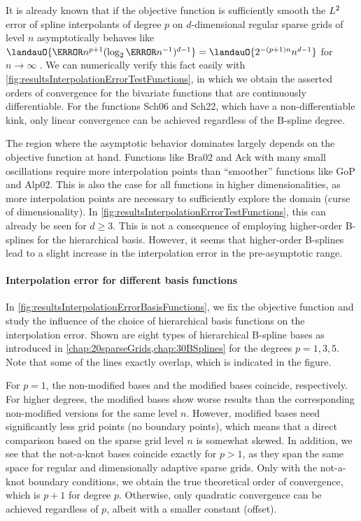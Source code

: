 It is already known that
if the objective function is sufficiently smooth
the $L^2$ error of spline interpolants of degree $p$ on
$d$-dimensional regular sparse grids of level $n$
asymptotically behaves like
$\landauO{\ms{n}^{p+1} (\log_2 \ms{n}^{-1})^{d-1}}
= \landauO{2^{-(p+1)n} n^{d-1}}$ for $n \to \infty$ \cite{Sickel11Spline}.
We can numerically verify this fact easily with
\cref{fig:resultsInterpolationErrorTestFunctions},
in which we obtain the asserted orders of convergence
for the bivariate functions that are continuously differentiable.
For the functions Sch06 and Sch22, which have a non-differentiable kink,
only linear convergence can be achieved regardless of the B-spline degree.

The region where the asymptotic behavior dominates largely depends
on the objective function at hand.
Functions like Bra02 and Ack with many small oscillations
require more interpolation points than ``smoother'' functions like
GoP and Alp02.
This is also the case for all functions in higher dimensionalities,
as more interpolation points are necessary to sufficiently explore the domain
(curse of dimensionality).
In \cref{fig:resultsInterpolationErrorTestFunctions}, this can already be seen
for $d \ge 3$.
This is not a consequence of employing higher-order B-splines for
the hierarchical basis.
However, it seems that higher-order B-splines lead to a slight increase
in the interpolation error in the pre-asymptotic range.

\paragraph{Interpolation error for different basis functions}

In \cref{fig:resultsInterpolationErrorBasisFunctions},
we fix the objective function and study the influence of the choice
of hierarchical basis functions on the interpolation error.
Shown are eight types of hierarchical B-spline bases as introduced in
\cref{chap:20sparseGrids,chap:30BSplines} for the degrees $p = 1, 3, 5$.
Note that some of the lines exactly overlap, which is indicated in
the figure.

For $p = 1$, the non-modified bases and the modified bases coincide,
respectively.
For higher degrees, the modified bases show worse results than
the corresponding non-modified versions for the same level $n$.
However, modified bases need significantly less grid points
(no boundary points),
which means that a direct comparison based on the sparse grid level $n$
is somewhat skewed.
%
In addition, we see that the not-a-knot bases coincide exactly for $p > 1$,
as they span the same space for regular and
dimensionally adaptive sparse grids.
Only with the not-a-knot boundary conditions, we obtain the true
theoretical order of convergence, which is $p + 1$ for degree $p$.
Otherwise, only quadratic convergence can be achieved regardless of $p$,
albeit with a smaller constant (offset).

